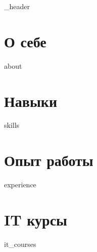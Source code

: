 \documentclass[letter,10pt]{article}
\author{Илья Казаков}
\begin{document}
{_header}
\vspace*{1pt}

\hline
\vspace*{10pt}

\section{О себе}\label{sec:-}
\vspace*{3pt}
{about}
\vspace*{10pt}

\section{Навыки}\label{sec:}
\vspace*{3pt}
{skills}
\vspace*{10pt}

\section{Опыт работы}\label{sec:-2}
\vspace*{3pt}
{experience}
\vspace*{10pt}

\section{IT курсы}\label{sec:2}
\vspace*{3pt}
{it_courses}
\vspace*{10pt}
\end{document}
